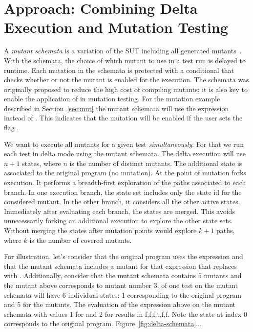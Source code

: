 \documentclass{sig-alternate}
\begin{document}

\section{Approach: Combining Delta Execution and Mutation Testing}

A \emph{mutant schemata} is a variation of the SUT including all
generated mutants~\cite{millo-etal-1988}.  With the schemata, the
choice of which mutant to use in a test run is delayed to runtime.
Each mutation in the schemata is protected with a conditional that
checks whether or not the mutant is enabled for the execution.  The
schemata was originally proposed to reduce the high cost of compiling
mutants; it
is also key to enable the application of \DE{} in mutation testing.
For the mutation example described in Section~\ref{sec:mut} the mutant
schemata will use the expression
 instead of
.  This indicates that the mutation will be
enabled if the user sets the flag .

We want \DE{} to execute all mutants for a given test
\emph{simultaneously}.  For that we run each test in delta mode using
the mutant schemata.  The delta execution will use $n + 1$ states,
where $n$ is the number of distinct mutants.  The additional state is
associated to the original program (no mutation).  At the point of
mutation \DE{} forks execution.  It performs a breadth-first
exploration of the paths associated to each branch.  In one execution
branch, the state set includes only the state id for the considered
mutant.  In the other branch, it considers all the other active
states.  Immediately after evaluating each branch, the states are
merged.  This avoids unnecessarily forking an additional execution to
explore the other state sets.  Without merging the states after
mutation points \DE{} would explore $k + 1$ paths, where $k$ is the
number of covered mutants.

For illustration, let's consider that the original program uses the
expression  and that the mutant schemata includes a
mutant for that expression that replaces \CodeIn{>} with \CodeIn{<}.
Additionally, consider that the mutant schemata contains 5 mutants and
the mutant above corresponds to mutant number 3.  \DE{} of one test on
the mutant schemata will have 6 individual states: 1 corresponding to
the original program and 5 for the mutants.  The evaluation of the
expression above on the mutant schemata with values \lt{}1\gt{} for
 and \lt{}2\gt{} for  results in
\lt{}f,f,f,t,f,f\gt{}.  Note the state at index 0 corresponds to the
original program.  Figure~\ref{fig:delta-schemata}...
\end{document}
